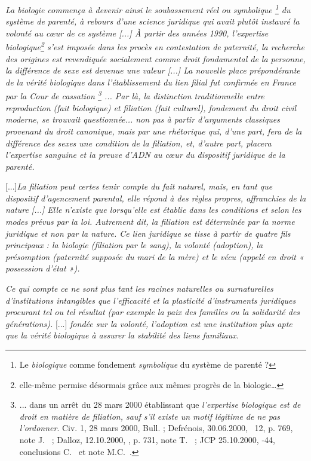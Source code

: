 \begin{displayquote}
{\emph{La biologie commença à devenir ainsi le soubassement réel ou symbolique%
\footnote{Le \emph{biologique} comme fondement \emph{symbolique} du système de parenté ?} 
du système de parenté, à rebours d'une science juridique qui avait plutôt instauré la volonté au cœur de ce système \emph{[...]} À partir des années 1990, l'expertise biologique\footnote{elle-même permise désormais grâce aux mêmes progrès de la biologie…} s'est imposée dans les procès en contestation de paternité, la recherche des origines est revendiquée socialement comme droit fondamental de la personne, la différence de sexe est devenue une valeur \emph{[...]} La nouvelle place prépondérante de la vérité biologique dans l'établissement du lien filial fut confirmée en France par la Cour de cassation%
\footnote{... dans un arrêt du 28 mars 2000 établissant que {\emph{l'expertise biologique est de droit en matière de filiation, sauf s'il existe un motif légitime de ne pas l'ordonner}}. Civ. 1\iere, 28 mars 2000, Bull.  ; \hbox{Defrénois}, \hbox{30.06.2000}, \no~12, p. 769, note J.~ ; \hbox{Dalloz}, \hbox{12.10.2000}, , p. 731, note T.~ ; JCP \hbox{25.10.2000}, -44, conclusions C.~ et note M.C.~.}%
... Par là, la distinction traditionnelle entre reproduction (fait biologique) et filiation (fait culturel), fondement du droit civil moderne, se trouvait questionnée... non pas à partir d'arguments classiques provenant du droit canonique, mais par une rhétorique qui, d'une part, fera de la différence des sexes une condition  de la filiation, et, d'autre part, placera l'expertise sanguine et la preuve d'ADN au cœur du dispositif juridique de la parenté.}}

[...]\emph{La filiation peut certes tenir compte du fait naturel, mais, en tant que dispositif d'agencement parental, elle répond à des règles propres, affranchies de la nature \emph{[...]} Elle n'existe que lorsqu'elle est établie dans les conditions et selon les modes prévus par la loi. Autrement dit, la filiation est déterminée par la norme juridique et non par la nature. Ce lien juridique se tisse à partir de quatre fils principaux : la biologie (filiation par le sang), la volonté (adoption), la présomption (paternité supposée du mari de la mère) et le vécu (appelé en droit « possession d'état »).}

\emph{Ce qui compte ce ne sont plus tant les racines naturelles ou surnaturelles d'institutions intangibles que l'efficacité et la plasticité d'instruments juridiques procurant tel ou tel résultat (par exemple la paix des familles ou la solidarité des générations).}  [...] \emph{fondée sur la volonté, l'adoption est une institution plus apte que la vérité biologique à assurer la stabilité des liens familiaux.}
 

\end{displayquote}
